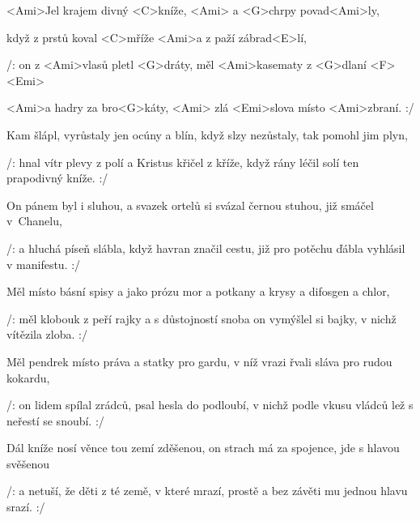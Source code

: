 

\zs
<Ami>Jel krajem divný <C>kníže, <Ami> a <G>chrpy povad<Ami>ly,

když z prstů koval <C>mříže <Ami>a z paží zábrad<E>lí,

/: on z <Ami>vlasů pletl <G>dráty, měl <Ami>kasematy z <G>dlaní <F> <Emi>

<Ami>a hadry za bro<G>káty, <Ami> zlá <Emi>slova místo <Ami>zbraní. :/
\ks

\zs
Kam šlápl, vyrůstaly jen ocúny a blín, když slzy nezůstaly, tak pomohl jim plyn,

/: hnal vítr plevy z polí a Kristus křičel z kříže, když rány léčil solí ten prapodivný kníže. :/
\ks

\zs
On pánem byl i sluhou, a svazek ortelů si svázal černou stuhou, již smáčel v~Chanelu,

/: a hluchá píseň slábla, když havran značil cestu, již pro potěchu ďábla vyhlásil v manifestu. :/
\ks

\zs
Měl místo básní spisy a jako prózu mor a potkany a krysy a difosgen a chlor,

/: měl klobouk z peří rajky a s důstojností snoba on vymýšlel si bajky, v nichž vítězila zloba. :/
\ks

\zs
Měl pendrek místo práva a statky pro gardu, v níž vrazi řvali sláva pro rudou kokardu,

/: on lidem spílal zrádců, psal hesla do podloubí, v nichž podle vkusu vládců lež s neřestí se snoubí. :/
\ks

\zs
Dál kníže nosí věnce tou zemí zděšenou, on strach má za spojence, jde s hlavou svěšenou

/: a netuší, že děti z té země, v které mrazí, prostě a bez závěti mu jednou hlavu srazí. :/
\ks

\kp
